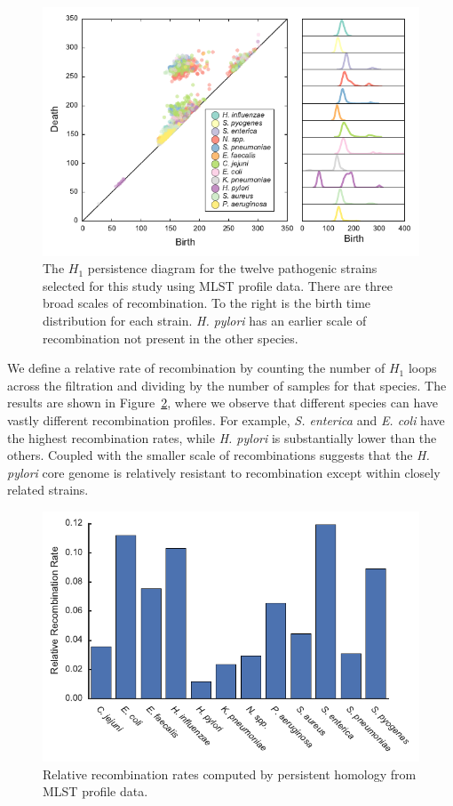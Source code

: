 \begin{figure}
    \centering
    \includegraphics[width=\textwidth]{./fig/pathogen_persistence_diagram.pdf}
    \caption{The $H_1$ persistence diagram for the twelve pathogenic strains selected for this study using MLST profile data. There are three broad scales of recombination. To the right is the birth time distribution for each strain. \emph{H. pylori} has an earlier scale of recombination not present in the other species.}
    \label{fig:pathogen_persistence_diagram}
\end{figure}

We define a relative rate of recombination by counting the number of $H_1$ loops across the filtration and dividing by the number of samples for that species.
The results are shown in Figure~\ref{fig:pathogen_barchart}, where we observe that different species can have vastly different recombination profiles.
For example, \emph{S. enterica} and \emph{E. coli} have the highest recombination rates, while \emph{H. pylori} is substantially lower than the others.
Coupled with the smaller scale of recombinations suggests that the \emph{H. pylori} core genome is relatively resistant to recombination except within closely related strains.

\begin{figure}
    \centering
    \includegraphics[width=\textwidth]{./fig/pathogen_barchart.pdf}
    \caption{Relative recombination rates computed by persistent homology from MLST profile data.}
    \label{fig:pathogen_barchart}
\end{figure}

